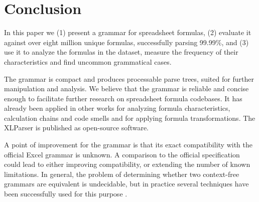 \documentclass[times]{smrauth}
\begin{document}
\section{Conclusion}
\label{section:conclusion}
In this paper we (1) present a grammar for spreadsheet formulas, (2) evaluate it against over eight million unique formulas, successfully parsing 99.99\%, and (3) use it to analyze the formulas in the dataset, measure the frequency of their characteristics and find uncommon grammatical cases.

The grammar is compact and produces processable parse trees, suited for further manipulation and analysis. We believe that the grammar is reliable and concise enough to facilitate further research on spreadsheet formula codebases. It has already been applied in other works for analyzing formula characteristics, calculation chains and code smells and for applying formula transformations. The XLParser is published as open-source software.

A point of improvement for the grammar is that its exact compatibility with the official Excel grammar is unknown.
A comparison to the official specification could lead to either improving compatibility, or extending the number of known limitations.
In general, the problem of determining whether two context-free grammars are equivalent is undecidable, but in practice several techniques have been successfully used for this purpose \cite{lammel2009introduction,fischer2012comparison}.



\end{document}
